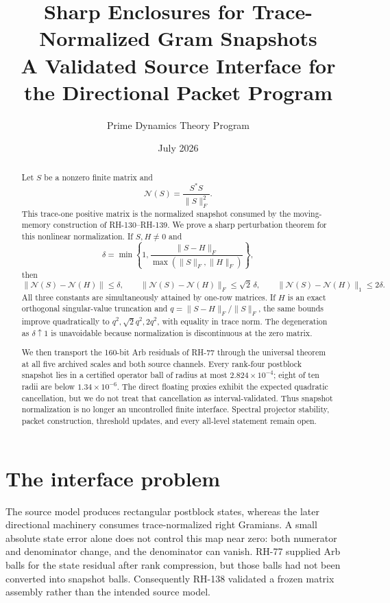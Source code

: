 \documentclass[12pt]{article}
\title{Sharp Enclosures for Trace-Normalized Gram Snapshots\\\large A Validated Source Interface for the Directional Packet Program}
\author{Prime Dynamics Theory Program}
\date{July 2026}
\begin{document}
\maketitle

\begin{abstract}
Let $S$ be a nonzero finite matrix and
\[
  \mathcal N(S)=\frac{S^*S}{\|S\|_F^2}.
\]
This trace-one positive matrix is the normalized snapshot consumed by the
moving-memory construction of RH-130--RH-139.  We prove a sharp perturbation
theorem for this nonlinear normalization.  If $S,H\ne0$ and
\[
 \delta=\min\!\left\{1,\frac{\|S-H\|_F}
 {\max(\|S\|_F,\|H\|_F)}\right\},
\]
then
\[
 \|\mathcal N(S)-\mathcal N(H)\|\leq\delta,\qquad
 \|\mathcal N(S)-\mathcal N(H)\|_F\leq\sqrt2\,\delta,
 \qquad
 \|\mathcal N(S)-\mathcal N(H)\|_1\leq2\delta.
\]
All three constants are simultaneously attained by one-row matrices.  If
$H$ is an exact orthogonal singular-value truncation and
$q=\|S-H\|_F/\|S\|_F$, the same bounds improve quadratically to
$q^2,\sqrt2q^2,2q^2$, with equality in trace norm.  The degeneration as
$\delta\uparrow1$ is unavoidable because normalization is discontinuous at
the zero matrix.

We then transport the 160-bit Arb residuals of RH-77 through the universal
theorem at all five archived scales and both source channels.  Every
rank-four postblock snapshot lies in a certified operator ball of radius at
most $2.824\times10^{-4}$; eight of ten radii are below $1.34\times10^{-6}$.
The direct floating proxies exhibit the expected quadratic cancellation, but
we do not treat that cancellation as interval-validated.  Thus snapshot
normalization is no longer an uncontrolled finite interface.  Spectral
projector stability, packet construction, threshold updates, and every
all-level statement remain open.
\end{abstract}

\section{The interface problem}
The source model produces rectangular postblock states, whereas the later
directional machinery consumes trace-normalized right Gramians.  A small
absolute state error alone does not control this map near zero: both numerator
and denominator change, and the denominator can vanish.  RH-77 supplied Arb
balls for the state residual after rank compression, but those balls had not
been converted into snapshot balls.  Consequently RH-138 validated a frozen
matrix assembly rather than the intended source model.
\end{document}
